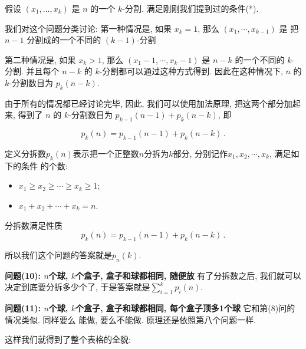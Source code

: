 假设 \((x_1,\ldots,x_k)\) 是 \(n\) 的一个 \(k\)-分割. 满足刚刚我们提到过的条件(*).

我们对这个问题分类讨论: 第一种情况是, 如果 \(x_k = 1\),
那么 \((x_1,\cdots,x_{k-1})\) 是 把\(n-1\) 分割成的一个不同的 \((k-1)\)-分割

第二种情况是, 如果 \(x_k > 1\), 那么 \((x_1-1,\cdots,x_{k}-1)\) 是 \(n-k\)
的一个不同的 \(k\)-分割. 并且每个 \(n-k\) 的 \(k\)-分割都可以通过这种方式得到.
因此在这种情况下, \(n\) 的 \(k\)-分割数目为 \(p_k(n-k)\).

由于所有的情况都已经讨论完毕, 因此, 我们可以使用加法原理, 把这两个部分加起来, 得到了
\(n\) 的 \(k\)-分割数目为 \(p_{k-1}(n-1) + p_k(n-k)\), 即

\[p_k(n)=p_{k-1}(n-1)+p_k(n-k)\,.\]

\begin{definition}[分拆数]
    定义分拆数$p_k(n)$表示把一个正整数$n$分拆为$k$部分, 分别记作$x_1, x_2, \cdots, x_k$, 满足如下的条件
    的个数:
    \begin{itemize}[noitemsep]
        \item  $x_1\ge x_2\ge\cdots\ge x_k\ge 1$;
        \item $x_1+x_2+\cdots+x_k=n$.
    \end{itemize}
\end{definition}

\begin{theorem}
    分拆数满足性质
    $$p_k(n)=p_{k-1}(n-1)+p_k(n-k)\,.$$
\end{theorem}

所以我们这个问题的答案就是$p_n(k)$.

\textbf{问题(10): $n$个球, $k$个盒子, 盒子和球都相同, 随便放  }
有了分拆数之后, 我们就可以决定到底要分拆多少个了,  于是答案就是$\sum_{i=1}^{k}p_i(n)$.

\textbf{问题(11): $n$个球, $k$个盒子, 盒子和球都相同, 每个盒子顶多1个球  } 它和第(8)问的情况类似. 同样要么
能做, 要么不能做. 原理还是依照第八个问题一样.

这样我们就得到了整个表格的全貌:

